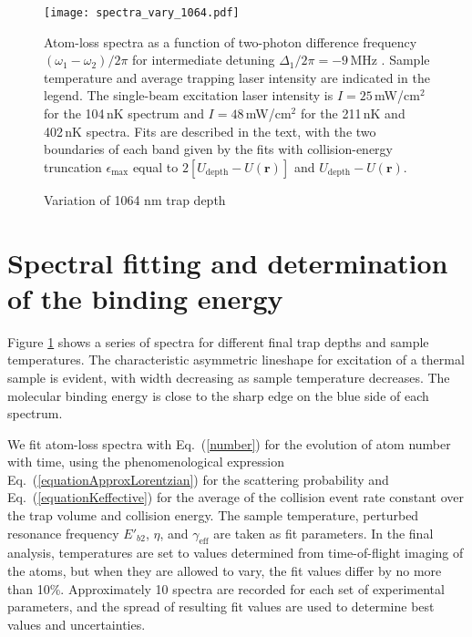 \begin{figure} \label{Fig:Spectraminus9MHzVaryTrapCold}
\centerline{
  \texttt{[image: spectra\_vary\_1064.pdf]}}
  \caption{Variation of 1064 nm trap depth}{Atom-loss spectra as a function of two-photon difference frequency $(\omega_1-\omega_2)/2\pi$ for intermediate detuning
$\Delta_1/2\pi=-9$\,MHz . Sample temperature and average trapping laser intensity are indicated in the legend. The single-beam excitation laser intensity is $I=25$\,mW/cm$^{2}$ for the 104\,nK spectrum and $I=48$\,mW/cm$^{2}$ for the 211\,nK and 402\,nK spectra. Fits are described in the text, with the two boundaries of each band given by the fits with collision-energy truncation
$\epsilon_{\text{max}}$ equal to $2[U_{\text{depth}}-U(\mathbf{r})]$ and $U_{\text{depth}}-U(\mathbf{r})$.}
\end{figure}

\section{Spectral fitting and determination of the binding energy}
\label{sec:lowE_Eb2}


Figure \ref{Fig:Spectraminus9MHzVaryTrapCold} shows a series of spectra for different final trap depths and sample temperatures. The characteristic asymmetric lineshape for excitation of a thermal sample is evident, with width decreasing as sample temperature decreases. The molecular binding energy is close to the sharp edge on the blue side of each spectrum.

We fit atom-loss spectra with Eq.\ (\ref{number}) for the evolution of atom number with time, using the phenomenological expression Eq.\ (\ref{equationApproxLorentzian}) for the scattering probability and Eq.\ (\ref{equationKeffective}) for the average of the collision event rate constant over the trap volume and collision energy. The sample temperature, perturbed resonance frequency $E'_{b2}$, $\eta$, and $\gamma_{\text{eff}}$ are taken as fit parameters. In the final analysis, temperatures are set to values determined from time-of-flight imaging of the atoms, but when they are allowed to vary, the fit values differ by no more than 10\%. Approximately 10 spectra are recorded for each set of experimental parameters, and the spread of resulting fit values are used to determine best values and uncertainties.


